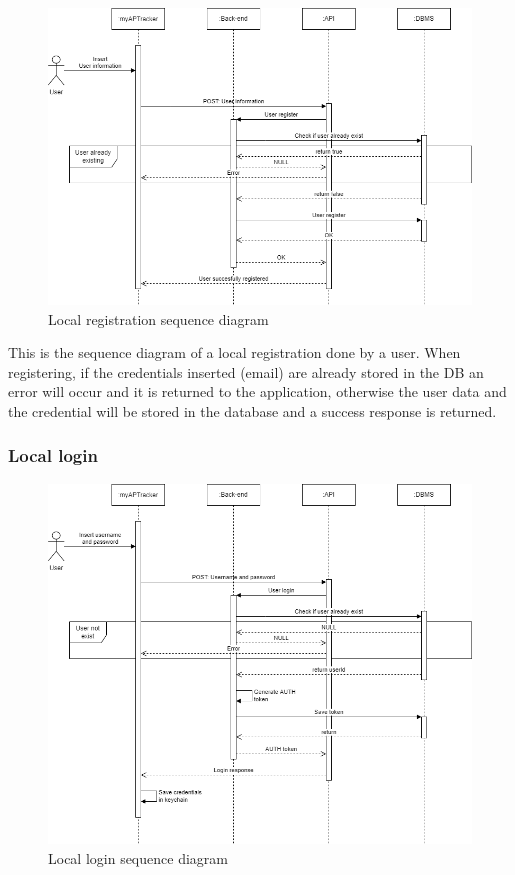 \begin{figure}[h!]
        \centering
        \includegraphics[scale=0.40]{images/runtime_view/local_registration.png}
        \caption{Local registration sequence diagram}
        \label{fig:local_registration_sequence_diagram}
\end{figure}
\FloatBarrier

This is the sequence diagram of a local registration done by a user. When registering, if the credentials inserted (email) are already stored in the DB an error will occur and it is returned to the application, otherwise the user data and the credential will be stored in the database and a success response is returned.
\newpage
\subsubsection{Local login}

\begin{figure}[h!]
        \centering
        \includegraphics[scale=0.40]{images/runtime_view/local_login.png}
        \caption{Local login sequence diagram}
        \label{fig:local_login_sequence_diagram}
\end{figure}
\FloatBarrier

